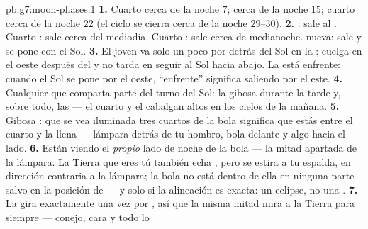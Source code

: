 \begin{solution}{pb:g7:moon-phases:1}
\textbf{1.} Cuarto  cerca de la noche $7$;  cerca
de la noche $15$; cuarto  cerca de la noche $22$ (el ciclo se
cierra cerca de la noche $29$--$30$).
\textbf{2.} : sale al . Cuarto : sale
cerca del mediodía. Cuarto : sale cerca de medianoche. 
nueva: sale y se pone con el Sol.
\textbf{3.} El  joven va solo un poco por detrás del Sol en
la : cuelga en el oeste después del  y no tarda en
seguir al Sol hacia abajo. La  está enfrente: cuando el Sol
se pone por el oeste, ``enfrente'' significa saliendo por el este.
\textbf{4.} Cualquier  que comparta parte del turno del Sol: la
gibosa  durante la tarde y, sobre todo, las 
 --- el cuarto  y el  
cabalgan altos en los cielos de la mañana.
\textbf{5.} Gibosa : que se vea iluminada tres cuartos de la
bola significa que estás entre el cuarto  y la llena ---
lámpara detrás de tu hombro, bola delante y algo hacia el lado.
\textbf{6.} Están viendo el \emph{propio} lado de noche de la bola ---
la mitad apartada de la lámpara. La Tierra que eres tú también echa
, pero se estira a tu espalda, en dirección contraria a la
lámpara; la bola no está dentro de ella en ninguna parte salvo en la
posición de  --- y solo si la alineación es exacta: un
eclipse, no una .
\textbf{7.} La  gira exactamente una vez por , así que la
misma mitad mira a la Tierra para siempre --- conejo, cara y todo lo

\end{solution}
